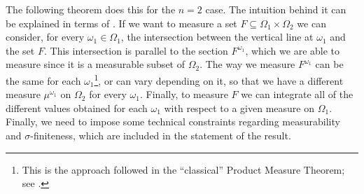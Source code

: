 The following theorem does this for the \(n=2\) case. The intuition behind it can be explained in terms of . If we want to measure a set \(F\subseteq\Omega_1\times\Omega_2\) we can consider, for every \(\omega_1\in\Omega_1\), the intersection between the vertical line at \(\omega_1\) and the set \(F\). This intersection is parallel to the section \(F^{\omega_1}\), which we are able to measure since it is a measurable subset of \(\Omega_2\). The way we measure \(F^{\omega_1}\) can be the same for each \(\omega_1\)\footnote{This is the approach followed in the ``classical'' Product Measure Theorem; see .}, or can vary depending on it, so that we have a different measure \(\mu^{\omega_1}\) on \(\Omega_2\) for every \(\omega_1\). Finally, to measure \(F\) we can integrate all of the different values obtained for each \(\omega_1\) with respect to a given measure on \(\Omega_1\). Finally, we need to impose some technical constraints regarding measurability and \(\sigma\)-finiteness, which are included in the statement of the result.

